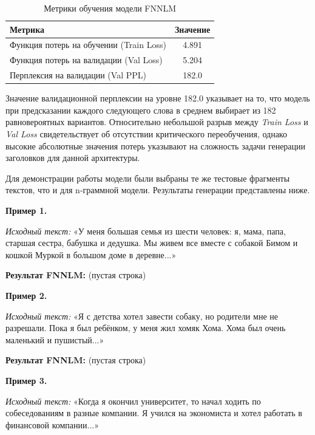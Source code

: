 \documentclass[coursework]{SCWorks}
\begin{document}
    \begin{table}[h!]
        \centering
        \caption{Метрики обучения модели FNNLM}
        \label{tab:fnnlm_metrics}
        \begin{tabular}{|l|c|}
            \hline
            \textbf{Метрика}                        & \textbf{Значение} \\ \hline
            Функция потерь на обучении (Train Loss) & 4.891             \\ \hline
            Функция потерь на валидации (Val Loss)  & 5.204             \\ \hline
            Перплексия на валидации (Val PPL)       & 182.0             \\ \hline
        \end{tabular}
    \end{table}

    Значение валидационной перплексии на уровне 182.0 указывает на то, что модель при предсказании каждого следующего слова в среднем выбирает из 182 равновероятных вариантов. Относительно небольшой разрыв между \textit{Train Loss} и \textit{Val Loss} свидетельствует об отсутствии критического переобучения, однако высокие абсолютные значения потерь указывают на сложность задачи генерации заголовков для данной архитектуры.

    Для демонстрации работы модели были выбраны те же тестовые фрагменты текстов, что и для n-граммной модели. Результаты генерации представлены ниже.

    \textbf{Пример 1.}

    \textit{Исходный текст:} «У меня большая семья из шести человек: я, мама, папа, старшая сестра, бабушка и дедушка. Мы живем все вместе с собакой Бимом и кошкой Муркой в большом доме в деревне...»

    \textbf{Результат FNNLM:} (пустая строка)

    \textbf{Пример 2.}

    \textit{Исходный текст:} «Я с детства хотел завести собаку, но родители мне не разрешали. Пока я был ребёнком, у меня жил хомяк Хома. Хома был очень маленький и пушистый...»

    \textbf{Результат FNNLM:} (пустая строка)

    \textbf{Пример 3.}

    \textit{Исходный текст:} «Когда я окончил университет, то начал ходить по собеседованиям в разные компании. Я учился на экономиста и хотел работать в финансовой компании...»
\end{document}

